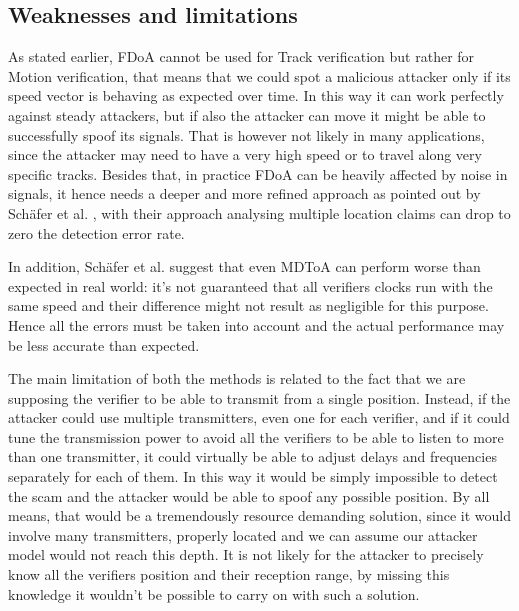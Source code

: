 \documentclass[conference]{IEEEtran}
\begin{document}
\subsection{Weaknesses and limitations}
As stated earlier, FDoA cannot be used for Track verification but rather for Motion verification, that means that we could spot a malicious attacker only if its speed vector is behaving as expected over time. In this way it can work perfectly against steady attackers, but if also the attacker can move it might be able to successfully spoof its signals. That is however not likely in many applications, since the attacker may need to have a very high speed or to travel along very specific tracks. Besides that, in practice FDoA can be heavily affected by noise in signals, it hence needs a deeper and more refined approach as pointed out by Schäfer et al. \cite{schaefer16}, with their approach analysing multiple location claims can drop to zero the detection error rate.

In addition, Schäfer et al. \cite{schaefer15} suggest that even MDToA can perform worse than expected in real world: it's not guaranteed that all verifiers clocks run with the same speed and their difference might not result as negligible for this purpose. Hence all the errors must be taken into account and the actual performance may be less accurate than expected.

The main limitation of both the methods is related to the fact that we are supposing the verifier to be able to transmit from a single position. Instead, if the attacker could use multiple transmitters, even one for each verifier, and if it could tune the transmission power to avoid all the verifiers to be able to listen to more than one transmitter, it could virtually be able to adjust delays and frequencies separately for each of them. In this way it would be simply impossible to detect the scam and the attacker would be able to spoof any possible position. By all means, that would be a tremendously resource demanding solution, since it would involve many transmitters, properly located and we can assume our attacker model would not reach this depth. It is not likely for the attacker to precisely know all the verifiers position and their reception range, by missing this knowledge it wouldn't be possible to carry on with such a solution.

\end{document}
